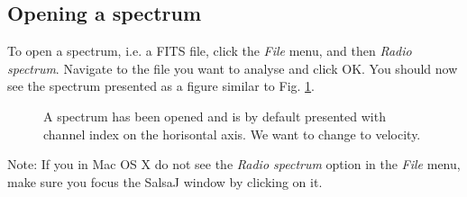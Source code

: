 \documentclass[11pt,a4paper]{article}
\begin{document}
\subsection{Opening a spectrum}
To open a spectrum, i.e. a FITS file, click the \emph{File} menu, and then
\emph{Radio spectrum}. Navigate to the file you want to analyse and click OK.
You should now see the spectrum presented as a figure similar to Fig. 
\ref{fig:opened}.
\begin{figure}[h!]
  \centering
  \caption{A spectrum has been opened and is by default presented with channel
  index on the horisontal axis. We want to change to velocity.}
  \label{fig:opened}
\end{figure}
Note: If you in Mac OS X do not see the \emph{Radio spectrum} option in the
\emph{File} menu, make sure you focus the SalsaJ window by clicking on it.
\end{document}
